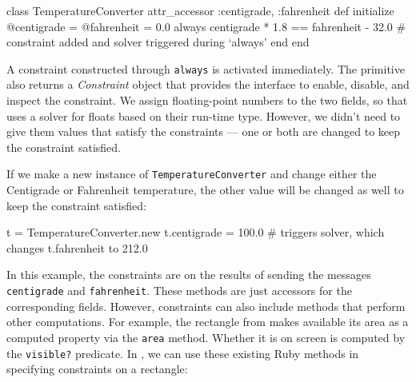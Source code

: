 \begin{code}
class TemperatureConverter
  attr_accessor :centigrade, :fahrenheit
  def initialize
    @centigrade = @fahrenheit = 0.0
    always { centigrade * 1.8 == fahrenheit - 32.0 }
    # constraint added and solver triggered during `always'
  end
end
\end{code}

A constraint constructed through \lstinline{always} is activated
immediately. The primitive also returns a \emph{Constraint} object
that provides the interface to enable, disable, and inspect the
constraint. We assign floating-point numbers to the two fields, so
that \toolname uses a solver for floats based on their run-time
type. However, we didn't need to give them values that satisfy the
constraints --- one or both are changed to keep the constraint
satisfied.

If we make a new instance of \lstinline{TemperatureConverter} and
change either the Centigrade or Fahrenheit temperature, the other
value will be changed as well to keep the constraint satisfied:

\begin{code}
t = TemperatureConverter.new
t.centigrade = 100.0 # triggers solver, which changes t.fahrenheit to 212.0
\end{code}




In this example, the constraints are on the results of sending the
messages \lstinline{centigrade} and \lstinline{fahrenheit}. These
methods are just accessors for the corresponding fields.  However,
constraints can also include methods that perform other
computations. For example, the rectangle from
 makes available its area as a computed property
via the \lstinline{area} method.  Whether it is on screen is
computed by the \lstinline{visible?} predicate. In \toolname, we can
use these existing Ruby methods in specifying constraints on a rectangle:

